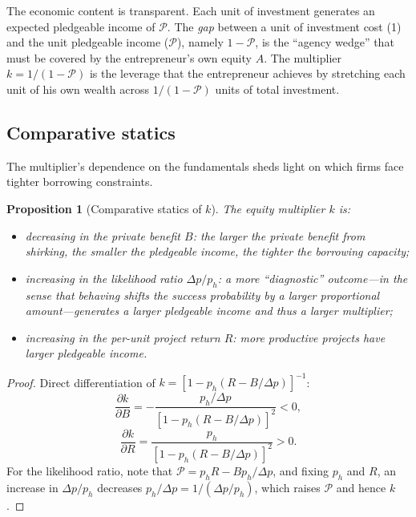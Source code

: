 \documentclass[11pt,a4paper,oneside]{book}
\theoremstyle{plain}
\newtheorem{proposition}[theorem]{Proposition}
\theoremstyle{definition}
\theoremstyle{remark}
\numberwithin{equation}{chapter}
\begin{document}
The economic content is transparent.
Each unit of investment generates an expected pledgeable income of $\mathcal{P}$.
The \emph{gap} between a unit of investment cost (1) and the unit pledgeable income ($\mathcal{P}$), namely $1 - \mathcal{P}$, is the ``agency wedge'' that must be covered by the entrepreneur's own equity $A$.
The multiplier $k = 1/(1 - \mathcal{P})$ is the leverage that the entrepreneur achieves by stretching each unit of his own wealth across $1/(1 - \mathcal{P})$ units of total investment.

\subsection{Comparative statics}

The multiplier's dependence on the fundamentals sheds light on which firms face tighter borrowing constraints.

\begin{proposition}[Comparative statics of $k$]\label{prop:EM-comp-statics}
The equity multiplier $k$ is:
\begin{itemize}
  \item \emph{decreasing} in the private benefit $B$: the larger the private benefit from shirking, the smaller the pledgeable income, the tighter the borrowing capacity;
  \item \emph{increasing} in the likelihood ratio $\Delta p / p_h$: a more ``diagnostic'' outcome---in the sense that behaving shifts the success probability by a larger proportional amount---generates a larger pledgeable income and thus a larger multiplier;
  \item \emph{increasing} in the per-unit project return $R$: more productive projects have larger pledgeable income.
\end{itemize}
\end{proposition}

\begin{proof}
Direct differentiation of $k = [1 - p_h(R - B/\Delta p)]^{-1}$:
\begin{equation*}
  \frac{\partial k}{\partial B} = -\frac{p_h/\Delta p}{[1 - p_h(R - B/\Delta p)]^2} < 0,
\end{equation*}
\begin{equation*}
  \frac{\partial k}{\partial R} = \frac{p_h}{[1 - p_h(R - B/\Delta p)]^2} > 0.
\end{equation*}
For the likelihood ratio, note that $\mathcal{P} = p_h R - B p_h/\Delta p$, and fixing $p_h$ and $R$, an increase in $\Delta p/p_h$ decreases $p_h/\Delta p = 1/(\Delta p/p_h)$, which raises $\mathcal{P}$ and hence $k$.
\end{proof}
\end{document}
